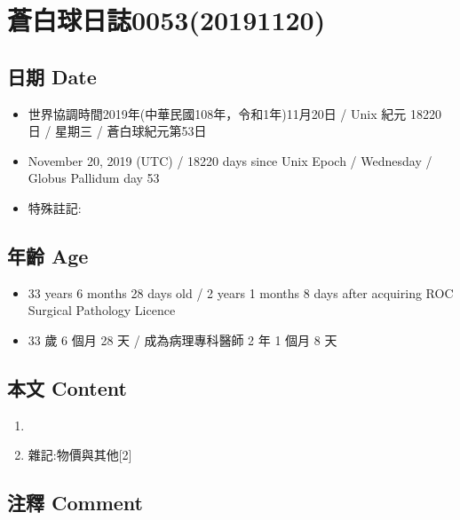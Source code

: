 \documentclass[a5paper, 12pt
]{book}
\providecommand{\tightlist}{%
  \setlength{\itemsep}{0pt}\setlength{\parskip}{0pt}}
\begin{document}
\hypertarget{ux84bcux767dux7403ux65e5ux8a8c005320191120}{%
\section{蒼白球日誌0053(20191120)}\label{ux84bcux767dux7403ux65e5ux8a8c005320191120}}

\hypertarget{ux65e5ux671f-date-52}{%
\subsection{日期 Date}\label{ux65e5ux671f-date-52}}

\begin{itemize}
\tightlist
\item
  世界協調時間2019年(中華民國108年，令和1年)11月20日 / Unix 紀元 18220
  日 / 星期三 / 蒼白球紀元第53日
\item
  November 20, 2019 (UTC) / 18220 days since Unix Epoch / Wednesday /
  Globus Pallidum day 53
\item
  特殊註記:
\end{itemize}

\hypertarget{ux5e74ux9f61-age-52}{%
\subsection{年齡 Age}\label{ux5e74ux9f61-age-52}}

\begin{itemize}
\tightlist
\item
  33 years 6 months 28 days old / 2 years 1 months 8 days after
  acquiring ROC Surgical Pathology Licence
\item
  33 歲 6 個月 28 天 / 成為病理專科醫師 2 年 1 個月 8 天
\end{itemize}

\hypertarget{ux672cux6587-content-52}{%
\subsection{本文 Content}\label{ux672cux6587-content-52}}

\begin{enumerate}
\def\labelenumi{\arabic{enumi}.}
\item
\item
  雜記:物價與其他{[}2{]}
\end{enumerate}

\hypertarget{ux6ce8ux91cb-comment-46}{%
\subsection{注釋 Comment}\label{ux6ce8ux91cb-comment-46}}
\end{document}
